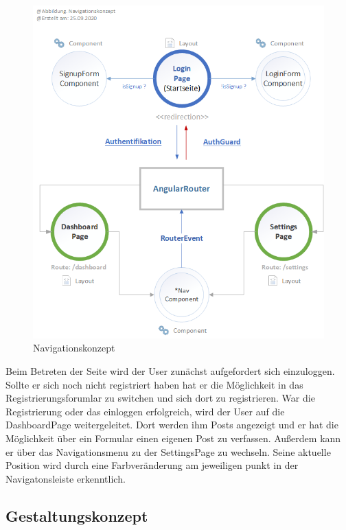 \documentclass[12pt,titlepage]{article}
\begin{document}
\begin{figure}[hbt!]
\centering
\includegraphics [width=400pt]{abbildungen/Abbildung_Navigationskonzept.png}
\caption{Navigationskonzept}
\end{figure}


\vspace{2cm}


Beim Betreten der Seite wird der User zunächst aufgefordert sich einzuloggen. Sollte er sich noch nicht registriert haben hat er die Möglichkeit in das Registrierungsforumlar zu switchen und sich dort zu registrieren. War die Registrierung oder das einloggen erfolgreich, wird der User auf die DashboardPage weitergeleitet. Dort werden ihm Posts angezeigt und er hat die Möglichkeit über ein Formular einen eigenen Post zu verfassen. Außerdem kann er über das Navigationsmenu zu der SettingsPage zu wechseln. Seine aktuelle Position wird durch eine Farbveränderung am jeweiligen punkt in der Navigatonsleiste erkenntlich.

\FloatBarrier
\subsection{Gestaltungskonzept}
\end{document}
